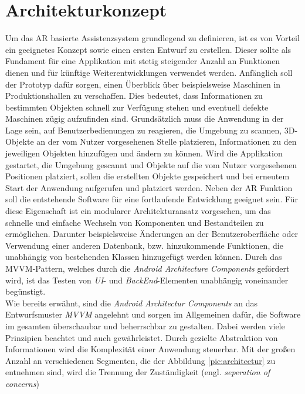 \section{Architekturkonzept}
\label{chap:Architekturkonzept}
Um das \acl{AR} basierte Assistenzsystem grundlegend zu definieren, ist es von Vorteil ein geeignetes Konzept sowie einen ersten Entwurf zu 
erstellen. Dieser sollte als Fundament für eine Applikation mit stetig steigender Anzahl an Funktionen dienen und für künftige Weiterentwicklungen 
verwendet werden. Anfänglich soll der Prototyp dafür sorgen, einen Überblick über beispielsweise Maschinen in Produktionshallen zu 
verschaffen. Dies bedeutet, dass Informationen zu bestimmten Objekten schnell zur Verfügung stehen und eventuell defekte Maschinen zügig 
aufzufinden sind. Grundsätzlich muss die Anwendung in der Lage sein, auf Benutzerbedienungen zu reagieren, die Umgebung zu scannen, 3D-Objekte 
an der vom Nutzer vorgesehenen Stelle platzieren, Informationen zu den jeweiligen Objekten hinzufügen und ändern zu können. Wird die 
Applikation gestartet, die Umgebung gescannt und Objekte auf die vom Nutzer vorgesehenen Positionen platziert, sollen die erstellten Objekte 
gespeichert und bei erneutem Start der Anwendung aufgerufen und platziert werden. Neben der \acl{AR} Funktion soll die %
entstehende Software für eine fortlaufende Entwicklung geeignet sein. Für diese Eigenschaft ist ein modularer Architekturansatz vorgesehen, 
um das schnelle und einfache Wechseln von Komponenten und Bestandteilen zu ermöglichen. Darunter beispielsweise Änderungen an der 
Benutzeroberfläche oder Verwendung einer anderen Datenbank, bzw. hinzukommende Funktionen, die unabhängig von bestehenden Klassen 
hinzugefügt werden können. Durch das \acs{MVVM}-Pattern, welches durch die \textit{Android Architecture Components} gefördert wird, ist 
das Testen von \textit{\acs{UI}}- und \textit{BackEnd}-Elementen unabhängig voneinander begünstigt. 
\\ 
\linebreak
Wie bereits erwähnt, sind die \textit{Android Architectur Components} an das Entwurfsmuster \textit{MVVM} angelehnt und sorgen im Allgemeinen 
dafür, die Software im gesamten überschaubar und beherrschbar zu gestalten. Dabei werden viele Prinzipien beachtet und auch gewährleistet. 
Durch gezielte Abstraktion von Informationen wird die Komplexität einer Anwendung steuerbar. Mit der großen Anzahl an verschiedenen 
Segmenten, die der Abbildung \ref{pic:architectur} zu entnehmen sind, wird die Trennung der Zuständigkeit (engl. \textit{seperation of concerns}) 
